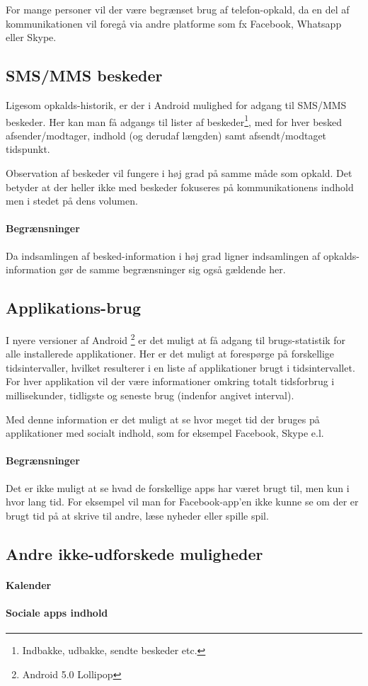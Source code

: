 For mange personer  vil der være begrænset brug af telefon-opkald, da en del af kommunikationen vil foregå via andre platforme som fx Facebook, Whatsapp eller Skype.

\subsection{SMS/MMS beskeder}
Ligesom opkalds-historik, er der i Android mulighed for adgang til SMS/MMS beskeder.
Her kan man få adgangs til lister af beskeder\footnote{Indbakke, udbakke, sendte beskeder etc.}, med for hver besked afsender/modtager, indhold (og derudaf længden) samt afsendt/modtaget tidspunkt.

Observation af beskeder vil fungere i høj grad på samme måde som opkald.
Det betyder at der heller ikke med beskeder fokuseres på kommunikationens indhold men i stedet på dens volumen.

\paragraph{Begrænsninger}
Da indsamlingen af besked-information i høj grad ligner indsamlingen af opkalds-information gør de samme begrænsninger sig også gældende her.

\subsection{Applikations-brug}
I nyere versioner af Android \footnote{Android 5.0 Lollipop} er det muligt at få adgang til brugs-statistik for alle installerede applikationer.
Her er det muligt at forespørge på forskellige tidsintervaller, hvilket resulterer i en liste af applikationer brugt i tidsintervallet.
For hver applikation vil der være informationer omkring totalt tidsforbrug i millisekunder, tidligste og seneste brug (indenfor angivet interval).

Med denne information er det muligt at se hvor meget tid der bruges på applikationer med socialt indhold, som for eksempel Facebook, Skype e.l.

\paragraph{Begrænsninger}
Det er ikke muligt at se hvad de forskellige apps har været brugt til, men kun i hvor lang tid.
For eksempel vil man for Facebook-app'en ikke kunne se om der er brugt tid på at skrive til andre, læse nyheder eller spille spil.

\subsection{Andre ikke-udforskede muligheder}

\paragraph{Kalender}

\paragraph{Sociale apps indhold}
